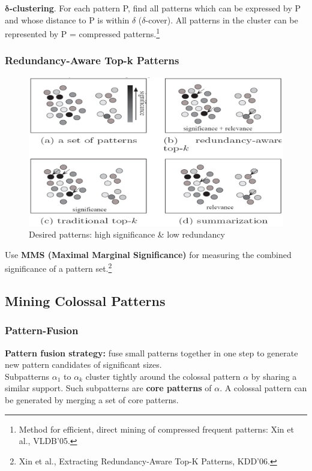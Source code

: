\textbf{$\mathbf{\delta}$-clustering}. For each pattern P, find all patterns which can be expressed by P and whose distance to P is within $\delta$ ($\delta$-cover). All patterns in the cluster can be represented by P = compressed patterns.\footnote{Method for efficient, direct mining of compressed frequent patterns: Xin et al., VLDB’05.}

\subsubsection{Redundancy-Aware Top-k Patterns}
\begin{figure}[h]
    \centering
    \includegraphics[width=\linewidth]{desired_patterns.png}
    \caption{Desired patterns: high significance \& low redundancy}
\end{figure}

Use \textbf{MMS (Maximal Marginal Significance)} for measuring the combined significance of a pattern set.\footnote{Xin et al., Extracting Redundancy-Aware Top-K Patterns, KDD’06.}

\subsection{Mining Colossal Patterns}
\subsubsection{Pattern-Fusion}
\textbf{Pattern fusion strategy:} fuse small patterns together in one step to generate new pattern candidates of significant sizes.\\

Subpatterns $\alpha_1$ to $\alpha_k$ cluster tightly around the colossal pattern $\alpha$ by sharing a similar support. Such subpatterns are \textbf{core patterns} of $\alpha$. A colossal pattern can be generated by merging a set of core patterns.

